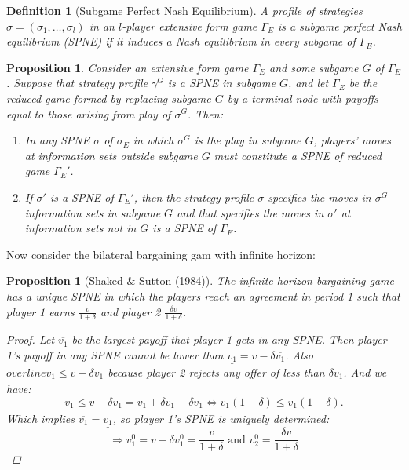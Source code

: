 \documentclass[12pt]{extreport} %
\theoremstyle{named}
\theoremstyle{itshape}
\newtheorem*{definition}{Definition}
\theoremstyle{normal}
\newtheorem{proposition}[unnamedtheorem]{Proposition}
\begin{document}
\begin{definition}[Subgame Perfect Nash Equilibrium]
	A profile of strategies $\sigma = (\sigma_1, \dotsc, \sigma_l)$ in an $l$-player extensive form game $\Gamma_E$ is a subgame perfect Nash equilibrium (SPNE) if it induces a Nash equilibrium in every subgame of $\Gamma_E$.	
\end{definition}

\begin{proposition}
	Consider an extensive form game $\Gamma_E$ and some subgame $G$ of $\Gamma_E$. Suppose that strategy profile $\gamma^G$ is a SPNE in subgame $G$, and let $\Gamma_E$ be the reduced game formed by replacing subgame $G$ by a terminal node with payoffs equal to those arising from play of $\sigma^G$. Then:
	\begin{enumerate}
		\item In any SPNE $\sigma$ of $\sigma_E$ in which $\sigma^G$ is the play in subgame $G$, players’ moves at information sets outside subgame $G$ must constitute a SPNE of reduced game $\Gamma_E'$.
		\item If $\sigma'$ is a SPNE of $\Gamma_E'$, then the strategy profile $\sigma$ specifies the moves in $\sigma^G$ information sets in subgame $G$ and that specifies the moves in $\sigma'$ at information sets not in $G$ is a SPNE of $\Gamma_E$.
	\end{enumerate}
\end{proposition}

Now consider the bilateral bargaining gam with infinite horizon:

\begin{proposition}[Shaked \& Sutton (1984)]
	The infinite horizon bargaining game has a unique SPNE in which the players reach an agreement in period 1 such that player 1 earns $\frac{v}{1 + \delta}$ and player 2 $\frac{\delta v}{1 + \delta}$.
	
	\begin{proof}
		Let $\overline{v_1}$ be the largest payoff that player 1 gets in any SPNE. Then player 1's payoff in any SPNE cannot be lower than $\underline{v_1} = v - \delta \overline{v_1}$. Also $overline{v_1} \leq v - \delta \underline{v_1}$ because player 2 rejects any offer of less than $\delta \underline{v_1}$. And we have:
		$$ \overline{v_1} \leq v - \delta \underline{v_1} = \underline{v_1} + \delta \overline{v_1} - \delta \underline{v_1} \iff \overline{v_1} (1 - \delta) \leq \underline{v_1} (1 - \delta). $$
		Which implies $\overline{v_1} = \underline{v_1}$, so player 1's SPNE is uniquely determined:
		$$ \Rightarrow v_1^0 = v - \delta v_1^0 = \frac{v}{1 + \delta} \text{ and } v_2^0 = \frac{\delta v}{1 + \delta} $$ 
	\end{proof}
\end{proposition}
\end{document}
